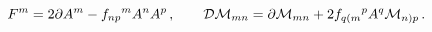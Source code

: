 \begin{equation}
  F^{m} = 2\partial A^{m} -f_{np}{}^{m}A^{n}A^{p} \,, \qquad
  {\cal D} {\cal M}_{mn} = \partial {\cal M}_{mn} + 2 f_{q(m}{}^{p} A^{q} {\cal M}_{n)p} \,.
\end{equation}

